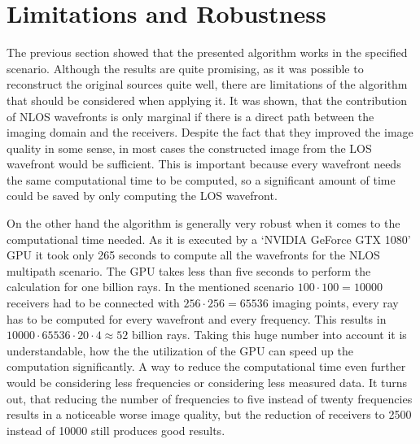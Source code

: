 \newpage
\section{Limitations and Robustness}
The previous section showed that the presented algorithm works in the specified scenario.
Although the results are quite promising, as it was possible to reconstruct the original sources quite well, there are limitations of the algorithm that should be considered when applying it.
It was shown, that the contribution of NLOS wavefronts is only marginal if there is a direct path between the imaging domain and the receivers.
Despite the fact that they improved the image quality in some sense, in most cases the constructed image from the LOS wavefront would be sufficient.
This is important because every wavefront needs the same computational time to be computed, so a significant amount of time could be saved by only computing the LOS wavefront.

On the other hand the algorithm is generally very robust when it comes to the computational time needed.
As it is executed by a `NVIDIA GeForce GTX 1080' GPU it took only 265 seconds to compute all the wavefronts for the NLOS multipath scenario.
The GPU takes less than five seconds to perform the calculation for one billion rays.
In the mentioned scenario \(100 \cdot 100 = 10000\) receivers had to be connected with \(256 \cdot 256 = 65536\) imaging points, every ray has to be computed for every wavefront and every frequency.
This results in \(10000 \cdot 65536 \cdot 20 \cdot 4 \approx 52\) billion rays.
Taking this huge number into account it is understandable, how the the utilization of the GPU can speed up the computation significantly.
A way to reduce the computational time even further would be considering less frequencies or considering less measured data.
It turns out, that reducing the number of frequencies to five instead of twenty frequencies results in a noticeable worse image quality, but the reduction of receivers to 2500 instead of 10000 still produces good results.

